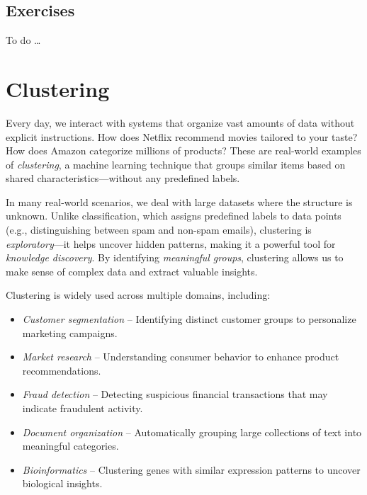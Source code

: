 \documentclass[
]{book}
\providecommand{\tightlist}{%
  \setlength{\itemsep}{0pt}\setlength{\parskip}{0pt}}
\theoremstyle{definition}
\theoremstyle{definition}
\theoremstyle{definition}
\theoremstyle{definition}
\theoremstyle{remark}
\begin{document}
\section{Exercises}\label{exercises-10}

To do \ldots{}

\chapter{Clustering}\label{chapter-cluster}

Every day, we interact with systems that organize vast amounts of data without explicit instructions. How does Netflix recommend movies tailored to your taste? How does Amazon categorize millions of products? These are real-world examples of \emph{clustering}, a machine learning technique that groups similar items based on shared characteristics---without any predefined labels.

In many real-world scenarios, we deal with large datasets where the structure is unknown. Unlike classification, which assigns predefined labels to data points (e.g., distinguishing between spam and non-spam emails), clustering is \emph{exploratory}---it helps uncover hidden patterns, making it a powerful tool for \emph{knowledge discovery}. By identifying \emph{meaningful groups}, clustering allows us to make sense of complex data and extract valuable insights.

Clustering is widely used across multiple domains, including:

\begin{itemize}
\tightlist
\item
  \emph{Customer segmentation} -- Identifying distinct customer groups to personalize marketing campaigns.\\
\item
  \emph{Market research} -- Understanding consumer behavior to enhance product recommendations.\\
\item
  \emph{Fraud detection} -- Detecting suspicious financial transactions that may indicate fraudulent activity.\\
\item
  \emph{Document organization} -- Automatically grouping large collections of text into meaningful categories.\\
\item
  \emph{Bioinformatics} -- Clustering genes with similar expression patterns to uncover biological insights.
\end{itemize}
\end{document}
